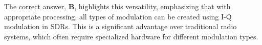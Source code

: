 The correct answer, \textbf{B}, highlights this versatility, emphasizing that with appropriate processing, all types of modulation can be created using I-Q modulation in SDRs. This is a significant advantage over traditional radio systems, which often require specialized hardware for different modulation types.

